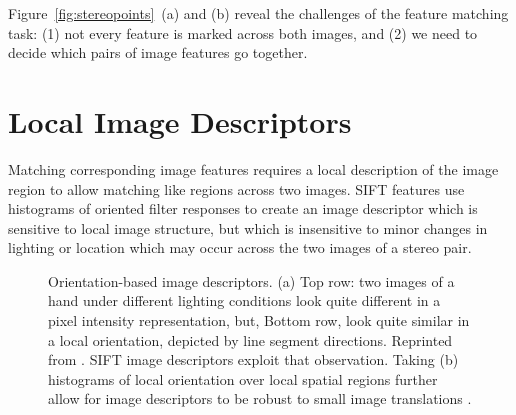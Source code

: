 Figure~\ref{fig:stereopoints}~(a) and (b) reveal the challenges of the feature matching task:  (1) not every feature is marked across both images, and (2) we need to decide which pairs of image features go together.  

\section{Local Image Descriptors}

Matching corresponding image features requires a local description of the image region to allow matching like regions across two images.  SIFT features  \cite{Lowe04} use histograms of oriented filter responses to create an image descriptor which is sensitive to local image structure, but which is insensitive to minor changes in lighting or location which may occur across the two images of a stereo pair.


\begin{figure}
\centerline{
}
\caption{Orientation-based image descriptors.  (a) Top row:  two images of a hand under different lighting conditions look quite different in a pixel intensity representation, but, Bottom row, look quite similar in a local orientation, depicted by line segment directions.  Reprinted from \cite{Freeman98c}.  SIFT image descriptors \cite{Lowe04} exploit that observation.  Taking (b) histograms of local orientation over local spatial regions further allow for image descriptors to be robust to small image translations \cite{Freeman98c,Lowe04}.  }
\label{fig:SIFT}
\end{figure}


